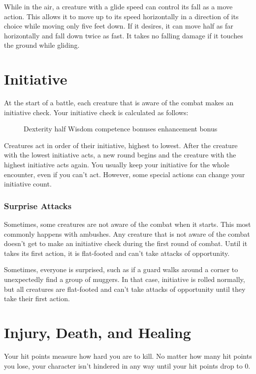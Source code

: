 While in the air, a creature with a glide speed can control its fall as a move action. This allows it to move up to its speed horizontally in a direction of its choice while moving only five feet down. If it desires, it can move half as far horizontally and fall down twice as fast. It takes no falling damage if it touches the ground while gliding.

\section{Initiative}\label{Initiative}

At the start of a battle, each creature that is aware of the combat makes an initiative check. Your initiative check is calculated as follows:

\begin{figure}[h]
    \centering Dexterity \add half Wisdom \add competence bonuses \add enhancement bonus
\end{figure}

Creatures act in order of their initiative, highest to lowest. After the creature with the lowest initiative acts, a new round begins and the creature with the highest initiative acts again. You usually keep your initiative for the whole encounter, even if you can't act. However, some special actions can change your initiative count.

\subsubsection{Surprise Attacks}\label{Surprise Attacks}
Sometimes, some creatures are not aware of the combat when it starts. This most commonly happens with ambushes. Any creature that is not aware of the combat doesn't get to make an initiative check during the first round of combat. Until it takes its first action, it is flat-footed and can't take attacks of opportunity.

Sometimes, everyone is surprised, such as if a guard walks around a corner to unexpectedly find a group of muggers. In that case, initiative is rolled normally, but all creatures are flat-footed and can't take attacks of opportunity until they take their first action.

\section{Injury, Death, and Healing}\label{Injury, Death, and Healing}
Your hit points measure how hard you are to kill. No matter how many hit points you lose, your character isn't hindered in any way until your hit points drop to 0.


